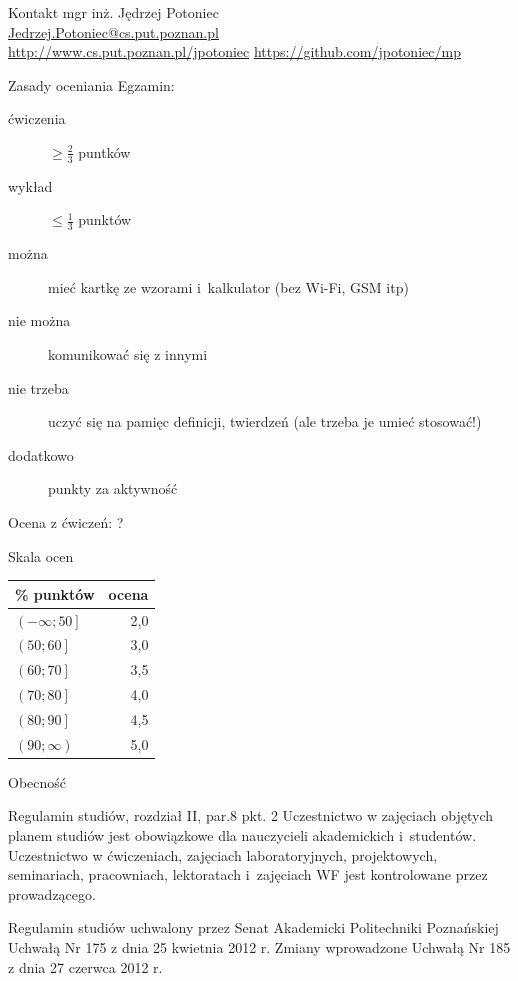 \documentclass{mp}
\subtitle{Uwagi organizacyjne}
\begin{document}
\begin{frame}
\titlepage
\end{frame}
\begin{frame}{Kontakt}
mgr inż. Jędrzej Potoniec \\
\url{Jedrzej.Potoniec@cs.put.poznan.pl}\\
\url{http://www.cs.put.poznan.pl/jpotoniec}
\url{https://github.com/jpotoniec/mp}
\end{frame}
\begin{frame}{Zasady oceniania}
Egzamin:
\begin{description}
	\item[ćwiczenia] $\geq \frac{2}{3}$ puntków
	\item[wykład] $\leq \frac{1}{3}$ punktów
	\item[można] mieć kartkę ze wzorami i~kalkulator (bez Wi-Fi, GSM itp)
	\item[nie można] komunikować się z innymi
	\item[nie trzeba] uczyć się na pamięc definicji, twierdzeń (ale trzeba je umieć stosować!)
	\item[dodatkowo] punkty za aktywność
\end{description}

Ocena z ćwiczeń: \alert{?}
\end{frame}
\begin{frame}{Skala ocen}
\begin{center}
\begin{tabular}{l|r}
\% punktów & ocena \\
\hline
$\left(-\infty; 50\right]$ & 2,0 \\
$\left(50; 60\right]$ & 3,0 \\
$\left(60; 70\right]$ & 3,5 \\
$\left(70; 80\right]$ & 4,0 \\
$\left(80; 90\right]$ & 4,5 \\
$\left(90; \infty\right)$ & 5,0 \\
\end{tabular}
\end{center}
\end{frame}
\begin{frame}{Obecność}
\begin{block}{Regulamin studiów, rozdział II, par.8 pkt. 2}
Uczestnictwo w zajęciach objętych planem studiów jest obowiązkowe dla nauczycieli akademickich i~studentów.
Uczestnictwo w ćwiczeniach, zajęciach laboratoryjnych, projektowych, seminariach, pracowniach, lektoratach i~zajęciach WF jest kontrolowane przez prowadzącego.
\end{block}
{\tiny Regulamin studiów uchwalony przez Senat Akademicki Politechniki Poznańskiej Uchwałą Nr 175 z dnia 25 kwietnia 2012 r. Zmiany wprowadzone Uchwałą Nr 185 z dnia 27 czerwca 2012 r.}
\end{frame}
\end{document}
